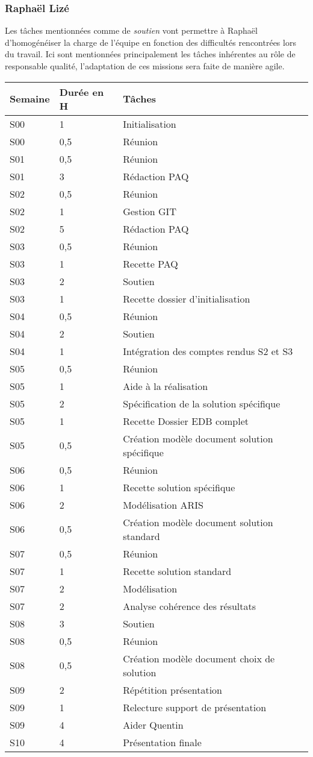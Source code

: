\pagebreak
\subsubsection{Raphaël Lizé}

Les tâches mentionnées comme de \textsl{soutien} vont permettre à Raphaël d'homogénéiser
la charge de l'équipe en fonction des difficultés rencontrées lors du travail. 
Ici sont mentionnées principalement les tâches inhérentes au rôle de responsable qualité,
l'adaptation de ces missions sera faite de manière agile.

\begin{longtable}{|l|l|l|}
\hline
Semaine&Durée en H&Tâches\\
\hline
S00&1&Initialisation\\
\hline
S00&0,5&Réunion\\
\hline
S01&0,5&Réunion\\
\hline
S01&3&Rédaction PAQ\\
\hline
S02&0,5&Réunion\\
\hline
S02&1&Gestion GIT\\
\hline
S02&5&Rédaction PAQ\\
\hline
S03&0,5&Réunion\\
\hline
S03&1&Recette PAQ\\
\hline
S03&2&Soutien\\
\hline
S03&1&Recette dossier d'initialisation\\
\hline
S04&0,5&Réunion\\
\hline
S04&2&Soutien\\
\hline
S04&1&Intégration des comptes rendus S2 et S3\\
\hline
S05&0,5&Réunion\\
\hline
S05&1&Aide à la réalisation\\
\hline
S05&2&Spécification de la solution spécifique\\
\hline
S05&1&Recette Dossier EDB complet\\
\hline
S05&0,5&Création modèle document solution spécifique\\
\hline
S06&0,5&Réunion\\
\hline
S06&1&Recette solution spécifique\\
\hline
S06&2&Modélisation ARIS\\
\hline
S06&0,5&Création modèle document solution standard\\
\hline
S07&0,5&Réunion\\
\hline
S07&1&Recette solution standard\\
\hline
S07&2&Modélisation\\
\hline
S07&2&Analyse cohérence des résultats\\
\hline
S08&3&Soutien\\
\hline
S08&0,5&Réunion\\
\hline
S08&0,5&Création modèle document choix de solution\\
\hline
S09&2&Répétition présentation\\
\hline
S09&1&Relecture support de présentation\\
\hline
S09&4&Aider Quentin\\
\hline
S10&4&Présentation finale\\
\hline
\end{longtable}
